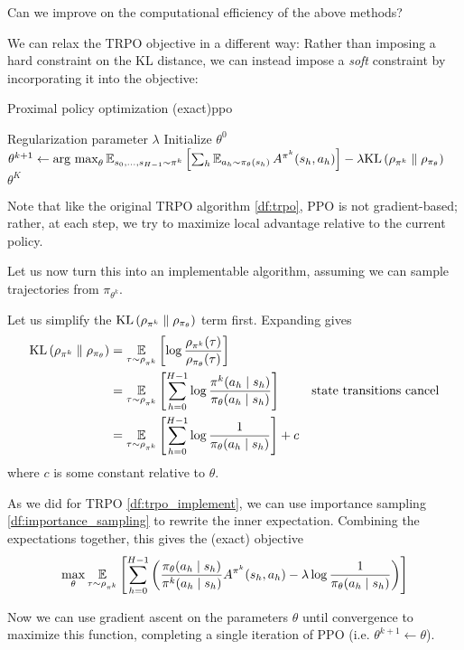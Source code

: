 \documentclass[\main/main]{subfiles}
\begin{document}
Can we improve on the computational efficiency of the above methods?


We can relax the TRPO objective in a different way: Rather than imposing a hard constraint on the KL distance, we can instead impose a \emph{soft} constraint by incorporating it into the objective:


\begin{definition}{Proximal policy optimization (exact)}{ppo}
    \begin{algorithmic}
        \Require Regularization parameter $\lambda$
        \State Initialize $\theta^0$
        \State $\theta^{k+1} \gets \operatorname*{\textrm{arg\ max}}_{\theta} \operatorname*{\mathbb{E}}_{s_0, \dots, s_{H-1} \sim \pi^k} \left[ \sum_h \operatorname*{\mathbb{E}}_{a_h \sim \pi_\theta(s_h)} A^{\pi^k}(s_h, a_h) \right] - \lambda \mathrm{KL}\left(\rho_{\pi^k} \parallel \rho_{\pi_{\theta}}\right)$
        \EndFor
        \State \Return $\theta^K$
    \end{algorithmic}

    Note that like the original TRPO algorithm \ref{df:trpo}, PPO is not gradient-based; rather, at each step, we try to maximize local advantage relative to the current policy.
\end{definition}

Let us now turn this into an implementable algorithm, assuming we can sample trajectories from $\pi_{\theta^k}$.


Let us simplify the $\mathrm{KL}\left(\rho_{\pi^k} \parallel \rho_{\pi_{\theta}}\right)$ term first. Expanding gives
\begin{align*}
    \mathrm{KL}\left(\rho_{\pi^k} \parallel \rho_{\pi_{\theta}}\right) & = \operatorname*{\mathbb{E}}_{\tau \sim \rho_{\pi^k}} \left[\log \frac{\rho_{\pi^k}(\tau)}{\rho_{\pi_{\theta}}(\tau)}\right]                                                       \\
                                           & = \operatorname*{\mathbb{E}}_{\tau \sim \rho_{\pi^k}} \left[ \sum_{h=0}^{H-1} \log \frac{\pi^k(a_h \mid s_h)}{\pi_{\theta}(a_h \mid s_h)}\right] & \text{state transitions cancel} \\
                                           & = \operatorname*{\mathbb{E}}_{\tau \sim \rho_{\pi^k}} \left[ \sum_{h=0}^{H-1} \log \frac{1}{\pi_{\theta}(a_h \mid s_h)}\right] + c
\end{align*}
where $c$ is some constant relative to $\theta$.

As we did for TRPO \eqref{df:trpo_implement}, we can use importance sampling \eqref{df:importance_sampling} to rewrite the inner expectation.
Combining the expectations together, this gives the (exact) objective
\[
    \max_{\theta} \operatorname*{\mathbb{E}}_{\tau \sim \rho_{\pi^k}} \left[ \sum_{h=0}^{H-1} \left( \frac{\pi_\theta(a_h \mid s_h)}{\pi^k(a_h \mid s_h)} A^{\pi^k}(s_h, a_h) - \lambda \log \frac{1}{\pi_\theta(a_h \mid s_h)} \right) \right]
\]

Now we can use gradient ascent on the parameters $\theta$ until convergence to maximize this function, completing a single iteration of PPO (i.e. $\theta^{k+1} \gets \theta$).
\end{document}
